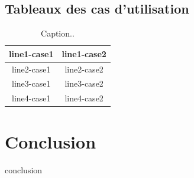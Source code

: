 \subsection{Tableaux des cas d'utilisation}


\begin{table}[!ht]
	\begin{center}
		\begin{tabular}{|c{5cm}|c{8cm}|}
			\hline
			line1-case1 & line1-case2 \\
			\hline
			line2-case1 & line2-case2 \\
			\hline
			line3-case1 & line3-case2 \\
			\hline
			line4-case1 & line4-case2 \\

			\hline
		\end{tabular}
		\caption{Caption..}
		\label{1}
	\end{center}
\end{table}






\section{Conclusion}
conclusion
